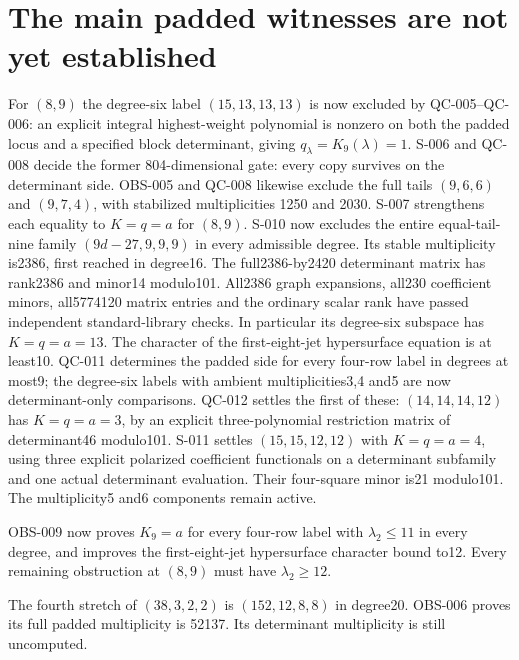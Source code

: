 \documentclass[11pt]{article}
\begin{document}
\section{The main padded witnesses are not yet established}
For $(8,9)$ the degree-six label $(15,13,13,13)$ is now excluded by
QC-005--QC-006: an explicit integral highest-weight polynomial is nonzero
on both the padded locus and a specified block determinant, giving
$q_\lambda=K_9(\lambda)=1$.
S-006 and QC-008 decide the former 804-dimensional gate: every copy
survives on the determinant side. OBS-005 and QC-008 likewise exclude
the full tails $(9,6,6)$ and $(9,7,4)$, with stabilized multiplicities
1250 and 2030. S-007 strengthens each equality to $K=q=a$ for $(8,9)$.
S-010 now excludes the entire equal-tail-nine family
$(9d-27,9,9,9)$ in every admissible degree. Its stable multiplicity
is2386, first reached in degree16. The full2386-by2420 determinant
matrix has rank2386 and minor14 modulo101. All2386 graph expansions,
all230 coefficient minors, all5774120 matrix entries and the ordinary
scalar rank have passed independent standard-library checks. In
particular its degree-six subspace has $K=q=a=13$. The character
of the first-eight-jet hypersurface equation is at least10. QC-011 determines the padded side for every four-row
label in degrees at most9; the degree-six labels with ambient
multiplicities3,4 and5 are now determinant-only comparisons. QC-012
settles the first of these: $(14,14,14,12)$ has $K=q=a=3$, by an
explicit three-polynomial restriction matrix of determinant46 modulo101.
S-011 settles $(15,15,12,12)$ with $K=q=a=4$, using three
explicit polarized coefficient functionals on a determinant subfamily
and one actual determinant evaluation. Their four-square minor is21
modulo101. The multiplicity5 and6 components remain active.

OBS-009 now proves $K_9=a$ for every four-row label with
$\lambda_2\leq11$ in every degree, and improves the first-eight-jet
hypersurface character bound to12. Every remaining obstruction at
$(8,9)$ must have $\lambda_2\geq12$.

The fourth stretch of $(38,3,2,2)$ is
$(152,12,8,8)$ in degree20. OBS-006 proves its full padded multiplicity
is 52137. Its determinant multiplicity is still uncomputed.
\end{document}
